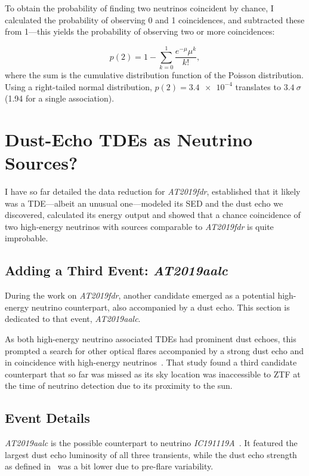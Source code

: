 To obtain the probability of finding two neutrinos coincident by chance, I calculated the probability of observing 0 and 1 coincidences, and subtracted these from 1---this yields the probability of observing two or more coincidences:

\begin{equation}
    p(2) = 1 - \sum_{k=0}^1 \frac{e^{-\mu}\mu^k}{k!},
\end{equation}
where the sum is the cumulative distribution function of the Poisson distribution. Using a right-tailed normal distribution, $p(2)=\num{3.4e-4}$ translates to $\SI{3.4}{\sigma}$ (\SI{1.94}{\sigma} for a single association).


\section{Dust-Echo TDEs as Neutrino Sources?}\label{at2019aalc}
I have so far detailed the data reduction for \emph{AT2019fdr}, established that it likely was a TDE---albeit an unusual one---modeled its SED and the dust echo we discovered, calculated its energy output and showed that a chance coincidence of two high-energy neutrinos with sources comparable to \emph{AT2019fdr} is quite improbable.

\subsection{Adding a Third Event: \textit{AT2019aalc}}
During the work on \textit{AT2019fdr}, another candidate emerged as a potential high-energy neutrino counterpart, also accompanied by a dust echo. This section is dedicated to that event, \textit{AT2019aalc}.

As both high-energy neutrino associated TDEs had prominent dust echoes, this prompted a search for other optical flares accompanied by a strong dust echo and in coincidence with high-energy neutrinos~\cite{Velzen2021}. That study found a third candidate counterpart that so far was missed as its sky location was inaccessible to ZTF at the time of neutrino detection due to its proximity to the sun.

\subsection{Event Details}
\textit{AT2019aalc} is the possible counterpart to neutrino \textit{IC191119A}~\cite{Velzen2021}. It featured the largest dust echo luminosity of all three transients, while the dust echo strength as defined in~\cite{Velzen2021} was a bit lower due to pre-flare variability.

